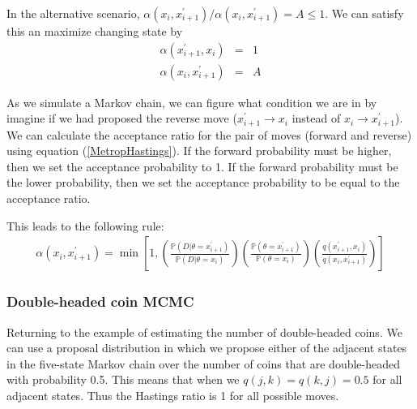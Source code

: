 \documentclass[11pt]{article}
\newcommand{\prop}[2]{q(#1,#2)}
\newcommand{\accept}[2]{\alpha({#1,#2})}
\renewcommand{\Pr}{{\mathbb P}}
\begin{document}
In the alternative scenario,  ${\accept{x_{i}}{x_{i + 1}^{\prime}}}/{\accept{x_{i}}{x_{i + 1}^{\prime}}} = A \leq 1$. We can satisfy this an maximize changing state by 
\begin{eqnarray*}
	\accept{x_{i + 1}^{\prime}}{x_{i}} & = &  1 \\
	\accept{x_{i}}{x_{i + 1}^{\prime}} & = & A
\end{eqnarray*}

As we simulate a Markov chain, we can figure what condition we are in by imagine if we had proposed the reverse move  ($x_{i + 1}^{\prime}\rightarrow x_{i}$ instead of $x_{i}\rightarrow x_{i + 1}^{\prime}$).
We can calculate the acceptance ratio for the pair of moves (forward and reverse) using equation (\ref{MetropHastings}).
If the forward probability must be higher, then we set the acceptance probability to 1.
If the forward probability must be the lower probability, then we set the acceptance probability to be equal to the acceptance ratio.

This leads to the following rule: 
\begin{eqnarray*}
	\accept{x_{i}}{x_{i + 1}^{\prime}} = \min\left[1, \left(\frac{\Pr(D|\theta=x_{i + 1}^{\prime})}{\Pr(D|\theta=x_{i})}\right)\left(\frac{\Pr(\theta=x_{i + 1}^{\prime})}{\Pr(\theta=x_{i})}\right)\left(\frac{\prop{x_{i + 1}^{\prime}}{x_{i}}}{\prop{x_{i}}{x_{i + 1}^{\prime}}}\right)\right]
\end{eqnarray*}

\subsubsection*{Double-headed coin MCMC}
Returning to the example of estimating the number of double-headed coins. We can use a proposal distribution in which we propose either of the adjacent states in the five-state Markov chain over the number of coins that are double-headed with probability 0.5.
This means that when we $\prop{j}{k}=\prop{k}{j}=0.5$ for all adjacent states.
Thus the Hastings ratio is 1 for all possible moves.
\end{document}
